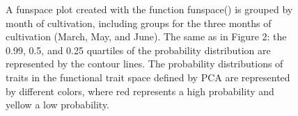 \documentclass[a4paper, 11, margin=2cm]{article}
\begin{document}
      \begin{figure}[H]
        \centering
        \caption{A funspace plot created with the function funspace() is grouped by month of cultivation, including groups for the three months of cultivation (March, May, and June). The same as in Figure 2: the 0.99, 0.5, and 0.25 quartiles of the probability distribution are represented by the contour lines. The probability distributions of traits in the functional trait space defined by PCA are represented by different colors, where red represents a high probability and yellow a low probability.}
      \end{figure}
\end{document}
